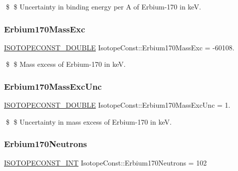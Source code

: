 \$ \$ Uncertainty in binding energy per A of Erbium-\/170 in keV. \mbox{\label{group___isotope_const-_erbium-_er170_ga80c5bb868f56088490337af7cf3661b8}} 
\subsubsection{\texorpdfstring{Erbium170\+Mass\+Exc}{Erbium170MassExc}}
{\footnotesize\ttfamily \mbox{\hyperlink{group___isotope_const-_macros_ga8f45a7272ce02c0b4c65c44636ed719a}{I\+S\+O\+T\+O\+P\+E\+C\+O\+N\+S\+T\+\_\+\+D\+O\+U\+B\+LE}} Isotope\+Const\+::\+Erbium170\+Mass\+Exc = -\/60108.}

\$ \$ Mass excess of Erbium-\/170 in keV. \mbox{\label{group___isotope_const-_erbium-_er170_gae41c9c5c6ecf383bf13cd29dd4efbe7e}} 
\subsubsection{\texorpdfstring{Erbium170\+Mass\+Exc\+Unc}{Erbium170MassExcUnc}}
{\footnotesize\ttfamily \mbox{\hyperlink{group___isotope_const-_macros_ga8f45a7272ce02c0b4c65c44636ed719a}{I\+S\+O\+T\+O\+P\+E\+C\+O\+N\+S\+T\+\_\+\+D\+O\+U\+B\+LE}} Isotope\+Const\+::\+Erbium170\+Mass\+Exc\+Unc = 1.}

\$ \$ Uncertainty in mass excess of Erbium-\/170 in keV. \mbox{\label{group___isotope_const-_erbium-_er170_ga5ac7786df74f7d9f96e13cac8c09624d}} 
\subsubsection{\texorpdfstring{Erbium170\+Neutrons}{Erbium170Neutrons}}
{\footnotesize\ttfamily \mbox{\hyperlink{group___isotope_const-_macros_ga5f18360b3e99483a35c32d789e62621c}{I\+S\+O\+T\+O\+P\+E\+C\+O\+N\+S\+T\+\_\+\+I\+NT}} Isotope\+Const\+::\+Erbium170\+Neutrons = 102}


